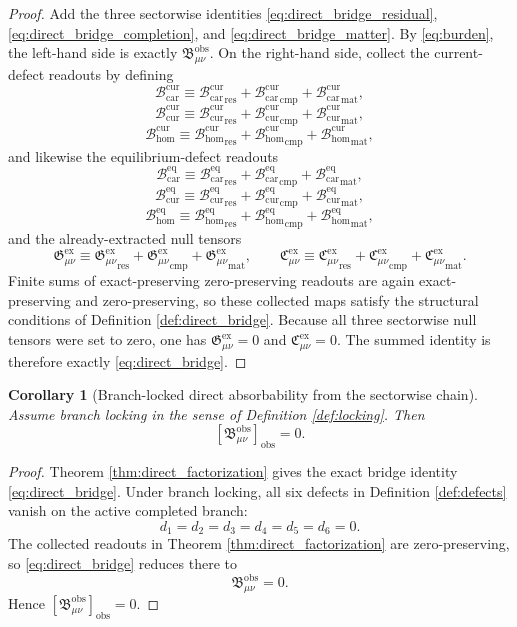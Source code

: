 \documentclass[11pt]{article}
\newcommand{\ObsBurden}{\mathfrak B_{\mu\nu}^{\mathrm{obs}}}
\newcommand{\ObserverClass}[1]{\left[#1\right]_{\mathrm{obs}}}
\newcommand{\GaugeExact}{\mathfrak G_{\mu\nu}^{\mathrm{ex}}}
\newcommand{\ConstraintExact}{\mathfrak C_{\mu\nu}^{\mathrm{ex}}}
\newcommand{\TensorCurrentBridge}{\mathcal B_{\mathrm{car}}^{\mathrm{cur}}}
\newcommand{\CurCurrentBridge}{\mathcal B_{\mathrm{cur}}^{\mathrm{cur}}}
\newcommand{\HomCurrentBridge}{\mathcal B_{\mathrm{hom}}^{\mathrm{cur}}}
\newcommand{\TensorEqBridge}{\mathcal B_{\mathrm{car}}^{\mathrm{eq}}}
\newcommand{\CurEqBridge}{\mathcal B_{\mathrm{cur}}^{\mathrm{eq}}}
\newcommand{\HomEqBridge}{\mathcal B_{\mathrm{hom}}^{\mathrm{eq}}}
\newtheorem{corollary}{Corollary}
\begin{document}
\begin{proof}
Add the three sectorwise identities \eqref{eq:direct_bridge_residual}, \eqref{eq:direct_bridge_completion}, and \eqref{eq:direct_bridge_matter}. By \eqref{eq:burden}, the left-hand side is exactly \(\ObsBurden\). On the right-hand side, collect the current-defect readouts by defining
\[
\TensorCurrentBridge
\equiv
{\TensorCurrentBridge}_{\mathrm{res}}
+{\TensorCurrentBridge}_{\mathrm{cmp}}
+{\TensorCurrentBridge}_{\mathrm{mat}},
\]
\[
\CurCurrentBridge
\equiv
{\CurCurrentBridge}_{\mathrm{res}}
+{\CurCurrentBridge}_{\mathrm{cmp}}
+{\CurCurrentBridge}_{\mathrm{mat}},
\]
\[
\HomCurrentBridge
\equiv
{\HomCurrentBridge}_{\mathrm{res}}
+{\HomCurrentBridge}_{\mathrm{cmp}}
+{\HomCurrentBridge}_{\mathrm{mat}},
\]
and likewise the equilibrium-defect readouts
\[
\TensorEqBridge
\equiv
{\TensorEqBridge}_{\mathrm{res}}
+{\TensorEqBridge}_{\mathrm{cmp}}
+{\TensorEqBridge}_{\mathrm{mat}},
\]
\[
\CurEqBridge
\equiv
{\CurEqBridge}_{\mathrm{res}}
+{\CurEqBridge}_{\mathrm{cmp}}
+{\CurEqBridge}_{\mathrm{mat}},
\]
\[
\HomEqBridge
\equiv
{\HomEqBridge}_{\mathrm{res}}
+{\HomEqBridge}_{\mathrm{cmp}}
+{\HomEqBridge}_{\mathrm{mat}},
\]
and the already-extracted null tensors
\[
\GaugeExact
\equiv
{\GaugeExact}_{\mathrm{res}}
+{\GaugeExact}_{\mathrm{cmp}}
+{\GaugeExact}_{\mathrm{mat}},
\qquad
\ConstraintExact
\equiv
{\ConstraintExact}_{\mathrm{res}}
+{\ConstraintExact}_{\mathrm{cmp}}
+{\ConstraintExact}_{\mathrm{mat}}.
\]
Finite sums of exact-preserving zero-preserving readouts are again exact-preserving and zero-preserving, so these collected maps satisfy the structural conditions of Definition \ref{def:direct_bridge}. Because all three sectorwise null tensors were set to zero, one has \(\GaugeExact=0\) and \(\ConstraintExact=0\). The summed identity is therefore exactly \eqref{eq:direct_bridge}.
\end{proof}

\begin{corollary}[Branch-locked direct absorbability from the sectorwise chain]
\label{cor:direct_factorization}
Assume branch locking in the sense of Definition \ref{def:locking}. Then
\[
\ObserverClass{\ObsBurden}=0.
\]
\end{corollary}

\begin{proof}
Theorem \ref{thm:direct_factorization} gives the exact bridge identity \eqref{eq:direct_bridge}. Under branch locking, all six defects in Definition \ref{def:defects} vanish on the active completed branch:
\[
d_1=d_2=d_3=d_4=d_5=d_6=0.
\]
The collected readouts in Theorem \ref{thm:direct_factorization} are zero-preserving, so \eqref{eq:direct_bridge} reduces there to
\[
\ObsBurden=0.
\]
Hence \(\ObserverClass{\ObsBurden}=0\).
\end{proof}
\end{document}
